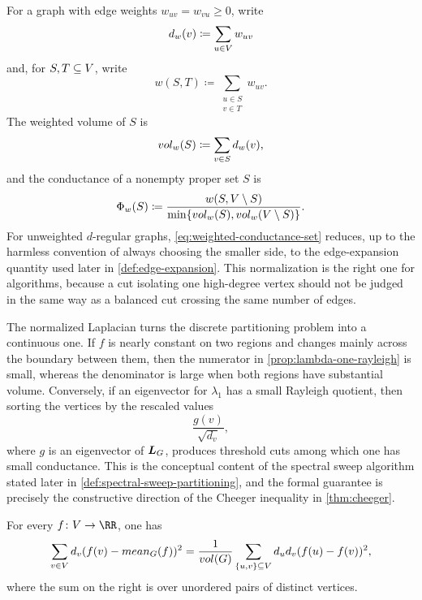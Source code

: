 For a graph with edge weights \(w_{uv}=w_{vu}\geq 0\), write
\begin{equation}
	\label{eq:weighted-degree-definition}
	d_w(v)\coloneqq \sum_{u\in V}w_{uv}
\end{equation}
and, for \(S,T\subseteq V\), write
\begin{equation}
	\label{eq:weighted-crossing-weight}
	w(S,T)\coloneqq \sum_{\substack{u\in S\\v\in T}}w_{uv}.
\end{equation}
The weighted volume of \(S\) is
\begin{equation}
	\label{eq:weighted-volume-definition}
	vol_w(S)\coloneqq \sum_{v\in S}d_w(v),
\end{equation}
and the conductance of a nonempty proper set \(S\) is
\begin{equation}
	\label{eq:weighted-conductance-set}
	\Phi_w(S)\coloneqq \frac{w(S,V\setminus S)}{\min\{vol_w(S),vol_w(V\setminus S)\}}.
\end{equation}
For unweighted \(d\)-regular graphs, \cref{eq:weighted-conductance-set} reduces, up to the harmless convention of always choosing the smaller side, to the edge-expansion quantity used later in \cref{def:edge-expansion}. This normalization is the right one for algorithms, because a cut isolating one high-degree vertex should not be judged in the same way as a balanced cut crossing the same number of edges.

The normalized Laplacian turns the discrete partitioning problem into a continuous one. If \(f\) is nearly constant on two regions and changes mainly across the boundary between them, then the numerator in \cref{prop:lambda-one-rayleigh} is small, whereas the denominator is large when both regions have substantial volume. Conversely, if an eigenvector for \(\lambda_1\) has a small Rayleigh quotient, then sorting the vertices by the rescaled values
\begin{equation}
	\label{eq:sweep-order-normalized-laplacian}
	\frac{g(v)}{\sqrt{d_v}},
\end{equation}
where \(g\) is an eigenvector of \(\boldsymbol{L}_{G}\), produces threshold cuts among which one has small conductance. This is the conceptual content of the spectral sweep algorithm stated later in \cref{def:spectral-sweep-partitioning}, and the formal guarantee is precisely the constructive direction of the Cheeger inequality in \cref{thm:cheeger}.

\begin{lemma}
	\label{lem:weighted-variance-identity}
	For every \(f\colon \Vertices\to\RR\), one has
	\begin{equation}
		\sum_{v\in V}d_v(f(v)-mean_{G}(f))^2
		=
		\frac{1}{vol(G)}\sum_{\{u,v\}\subseteq V}d_ud_v(f(u)-f(v))^2,
	\end{equation}
	where the sum on the right is over unordered pairs of distinct vertices.
\end{lemma}

